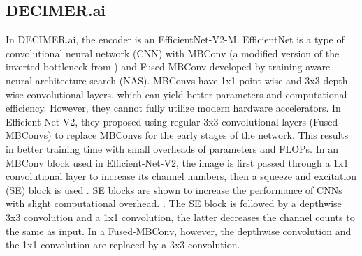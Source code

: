 \documentclass[conference]{IEEEtran}
\begin{document}
\subsection{DECIMER.ai}
In DECIMER.ai, the encoder is an EfficientNet-V2-M. EfficientNet is a type of convolutional neural network (CNN) with MBConv \cite{tan_efficientnet:_2020} (a modified version of the inverted bottleneck from \cite{mobilenet}) and Fused-MBConv \cite{suyog_efficientnet-edgetpu:_2019} developed by training-aware neural architecture search (NAS). \cite{swin_tran} \cite{effv2} MBConvs have 1x1 point-wise and 3x3 depth-wise convolutional layers, which can yield better parameters and computational efficiency. \cite{mobilenet} \cite{effv2} However, they cannot fully utilize modern hardware accelerators. In Efficient-Net-V2, they proposed using regular 3x3 convolutional layers (Fused-MBConvs) to replace MBConvs for the early stages of the network. This results in better training time with small overheads of parameters and FLOPs. In an MBConv block used in Efficient-Net-V2, the image is first passed through a 1x1 convolutional layer to increase its channel numbers, then a squeeze and excitation (SE) block is used \cite{hu_squeeze-and-excitation_2019}\cite{tan_efficientnet:_2020}. SE blocks are shown to increase the performance of CNNs with slight computational overhead. \cite{hu_squeeze-and-excitation_2019}. The SE block is followed by a depthwise 3x3 convolution and a 1x1 convolution, the latter decreases the channel counts to the same as input. In a Fused-MBConv, however, the depthwise convolution and the 1x1 convolution are replaced by a 3x3 convolution. \cite{effv2} \cite{mobilenet}
\end{document}
